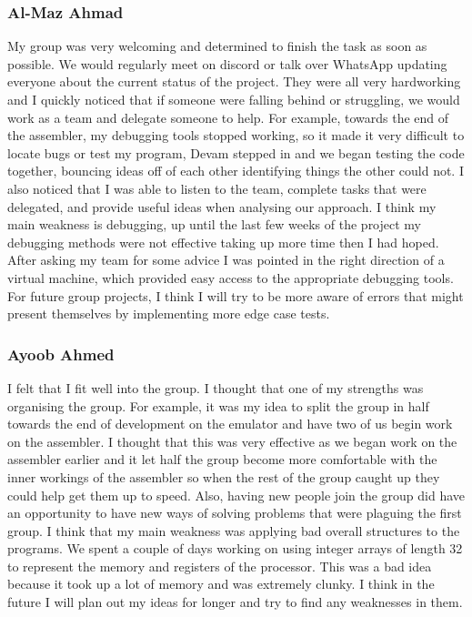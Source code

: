 \documentclass[10pt]{article}
\begin{document}
\subsubsection{Al-Maz Ahmad}
My group was very welcoming and determined to finish the task as soon as possible. We would regularly meet on discord or talk over WhatsApp updating everyone about the current status of the project. They were all very hardworking and I quickly noticed that if someone were falling behind or struggling, we would work as a team and delegate someone to help. For example, towards the end of the assembler, my debugging tools stopped working, so it made it very difficult to locate bugs or test my program, Devam stepped in and we began testing the code together, bouncing ideas off of each other identifying things the other could not. I also noticed that I was able to listen to the team, complete tasks that were delegated, and provide useful ideas when analysing our approach. I think my main weakness is debugging, up until the last few weeks of the project my debugging methods were not effective taking up more time then I had hoped. After asking my team for some advice I was pointed in the right direction of a virtual machine, which provided easy access to the appropriate debugging tools. For future group projects, I think I will try to be more aware of errors that might present themselves by implementing more edge case tests.
\subsubsection{Ayoob Ahmed}
I felt that I fit well into the group. I thought that one of my strengths was organising the group. For example, it was my idea to split the group in half towards the end of development on the emulator and have two of us begin work on the assembler. I thought that this was very effective as we began work on the assembler earlier and it let half the group become more comfortable with the inner workings of the assembler so when the rest of the group caught up they could help get them up to speed. Also, having new people join the group did have an opportunity to have new ways of solving problems that were plaguing the first group. I think that my main weakness was applying bad overall structures to the programs. We spent a couple of days working on using integer arrays of length 32 to represent the memory and registers of the processor. This was a bad idea because it took up a lot of memory and was extremely clunky. I think in the future I will plan out my ideas for longer and try to find any weaknesses in them.
\end{document}
